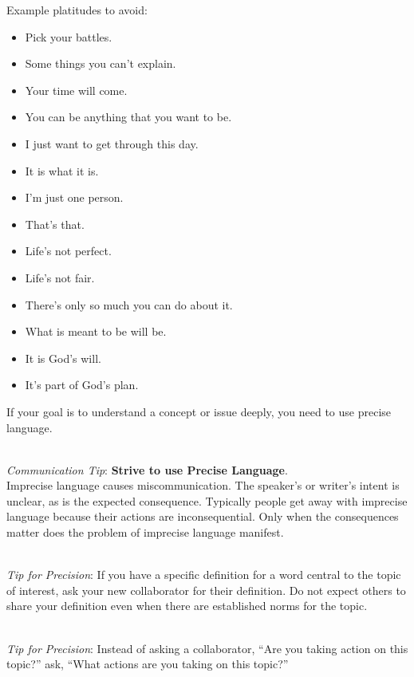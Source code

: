 Example platitudes to avoid:
\begin{itemize}
    \item Pick your battles.
    \item Some things you can't explain.
    \item Your time will come.
    \item You can be anything that you want to be.
    \item I just want to get through this day.
    \item It is what it is.
    \item I'm just one person.
    \item That's that.
    \item Life's not perfect.
    \item Life's not fair.
    \item There's only so much you can do about it.
    \item What is meant to be will be.
    \item It is God's will.
    \item It's part of God's plan.
\end{itemize}

If your goal is to understand a concept or issue deeply, you need to use precise language.

\ \\
\textit{Communication Tip}: \textbf{Strive to use Precise Language}.\\
Imprecise language causes miscommunication. The speaker's or writer's intent is unclear, as is the expected consequence. Typically people get away with imprecise language because their actions are inconsequential. Only when the consequences matter does the problem of imprecise language manifest.

\ \\
\textit{Tip for Precision}: If you have a specific definition for a word central to the topic of interest, ask your new collaborator for their definition. Do not expect others to share your definition even when there are established norms for the topic. 

\ \\
\textit{Tip for Precision}: Instead of asking a collaborator, ``Are you taking action on this topic?'' ask, ``What actions are you taking on this topic?''

